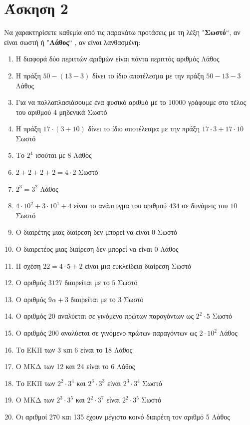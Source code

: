 \documentclass[a4paper,10pt]{report}
\begin{document}
\section*{Άσκηση 2  \hfill \small{}}
Να χαρακτηρίσετε καθεμία από τις παρακάτω προτάσεις με τη λέξη "\textbf{Σωστό}``, αν είναι σωστή ή  
"\textbf{Λάθος}`` , αν είναι λανθασμένη:
\begin{enumerate}[1)]
 \item Η διαφορά δύο περιττών αριθμών είναι πάντα περιττός αριθμός \color{bluesite} Λάθος \color{cblack}
 \item Η πράξη $50-(13-3)$ δίνει το ίδιο αποτέλεσμα με την πράξη $50-13-3$ \color{bluesite} Λάθος \color{cblack}
 \item Για να πολλαπλασιάσουμε ένα φυσικό αριθμό με το 10000 γράφουμε στο τέλος του αριθμού 4 μηδενικά \color{bluesite} Σωστό \color{cblack}
 \item Η πράξη $17\cdot(3+10)$ δίνει το ίδιο αποτέλεσμα με την πράξη $17\cdot3+17\cdot10$ \color{bluesite} Σωστό \color{cblack}
 \item Το $2^{4}$ ισούται με $8$ \color{bluesite} Λάθος \color{cblack}
 \item $2+2+2+2=4\cdot2$ \color{bluesite} Σωστό \color{cblack}
 \item $2^{3}=3^{2}$ \color{bluesite} Λάθος \color{cblack}
 \item $4\cdot10^{2}+3\cdot10^{1}+4$ είναι το ανάπτυγμα του αριθμού $434$ σε δυνάμεις του $10$ \color{bluesite} Σωστό  \color{cblack}
 \item Ο διαιρέτης μιας διαίρεση δεν μπορεί να είναι 0 \color{bluesite} Σωστό \color{cblack}
 \item Ο διαιρετέος μιας διαίρεση δεν μπορεί να είναι 0 \color{bluesite} Λάθος \color{cblack}
 \item Η σχέση $22=4\cdot5+2$ είναι μια ευκλείδεια διαίρεση \color{bluesite} Σωστό \color{cblack}
 \item Ο αριθμός $3127$ διαιρείται με το $5$ \color{bluesite} Σωστό  \color{cblack}
 \item Ο αριθμός $9α+3$ διαιρείται με το $3$ \color{bluesite} Σωστό \color{cblack}
 \item Ο αριθμός $20$ αναλύεται σε γινόμενο πρώτων παραγόντων ως $2^{2}\cdot 5$ \color{bluesite} Σωστό \color{cblack}
 \item Ο αριθμός $200$ αναλύεται σε γινόμενο πρώτων παραγόντων ως $2\cdot 10^{2}$ \color{bluesite} Λάθος \color{cblack}
 \item Το ΕΚΠ των 3 και 6 είναι το 18 \color{bluesite} Λάθος  \color{cblack}
 \item Ο ΜΚΔ των 12 και 24 είναι το 6 \color{bluesite} Λάθος \color{cblack}
 \item Το ΕΚΠ των $2^{2}\cdot 3^{4}$ και $2^{3}\cdot 3^{3}$ είναι $2^{3}\cdot 3^{4}$ \color{bluesite} Σωστό \color{cblack}
 \item O MKΔ των $2^{3}\cdot 3^{5}$ και $2^{2}\cdot 3^{7}$ είναι $2^{2}\cdot 3^{5}$ \color{bluesite} Σωστό  \color{cblack}
 \item Οι αριθμοί 270 και 135 έχουν μέγιστο κοινό διαιρέτη τον αριθμό 5 \color{bluesite} Λάθος \color{cblack}
\end{enumerate}
\end{document}
